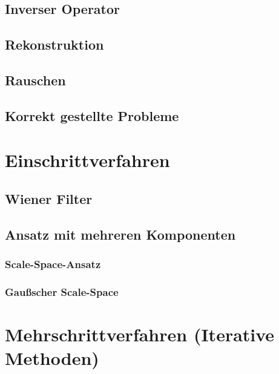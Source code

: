 \documentclass[a4paper, 11pt, accentcolor = tud3b]{tudreport}
\begin{document}
			\subsection{Inverser Operator} %

			\subsection{Rekonstruktion} %

			\subsection{Rauschen} %

			\subsection{Korrekt gestellte Probleme} %

		\section{Einschrittverfahren} %

			\subsection{Wiener Filter} %

			\subsection{Ansatz mit mehreren Komponenten} %

				\subsubsection{Scale-Space-Ansatz} %

				\subsubsection{Gaußscher Scale-Space} %

		\section{Mehrschrittverfahren (Iterative Methoden)} %
\end{document}
